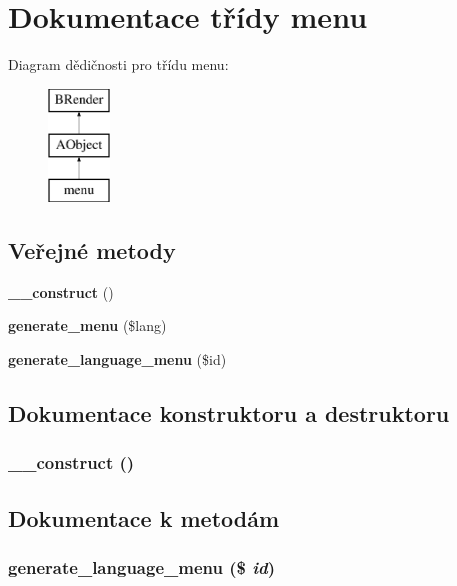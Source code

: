 \section{Dokumentace třídy menu}
\label{d7/d3d/classmenu}
Diagram dědičnosti pro třídu menu:\begin{figure}[H]
\begin{center}
\leavevmode
\includegraphics[height=3cm]{d7/d3d/classmenu}
\end{center}
\end{figure}
\subsection*{Veřejné metody}
\begin{DoxyCompactItemize}
\item 
{\bf \_\-\_\-construct} ()
\item 
{\bf generate\_\-menu} (\$lang)
\item 
{\bf generate\_\-language\_\-menu} (\$id)
\end{DoxyCompactItemize}


\subsection{Dokumentace konstruktoru a destruktoru}
\subsubsection[{\_\-\_\-construct}]{\setlength{\rightskip}{0pt plus 5cm}\_\-\_\-construct ()}\label{d7/d3d/classmenu_a095c5d389db211932136b53f25f39685}


\subsection{Dokumentace k metodám}
\subsubsection[{generate\_\-language\_\-menu}]{\setlength{\rightskip}{0pt plus 5cm}generate\_\-language\_\-menu (\$ {\em id})}\label{d7/d3d/classmenu_a67dddb989d851a6484ea7a03e9ad473e}
